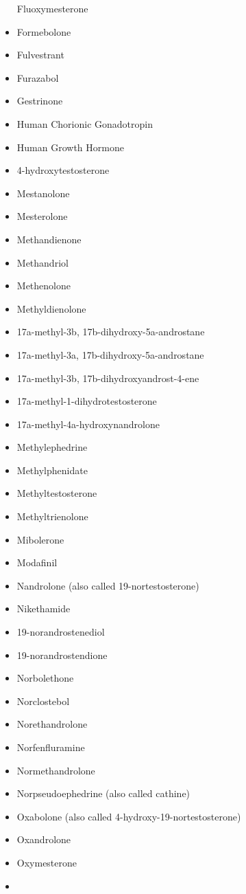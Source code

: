 \documentclass[
]{book}
\begin{document}
\begin{itemize}
  Fluoxymesterone
\item
  Formebolone
\item
  Fulvestrant
\item
  Furazabol
\item
  Gestrinone
\item
  Human Chorionic Gonadotropin
\item
  Human Growth Hormone
\item
  4-hydroxytestosterone
\item
  Mestanolone
\item
  Mesterolone
\item
  Methandienone
\item
  Methandriol
\item
  Methenolone
\item
  Methyldienolone
\item
  17a-methyl-3b, 17b-dihydroxy-5a-androstane
\item
  17a-methyl-3a, 17b-dihydroxy-5a-androstane
\item
  17a-methyl-3b, 17b-dihydroxyandrost-4-ene
\item
  17a-methyl-1-dihydrotestosterone
\item
  17a-methyl-4a-hydroxynandrolone
\item
  Methylephedrine
\item
  Methylphenidate
\item
  Methyltestosterone
\item
  Methyltrienolone
\item
  Mibolerone
\item
  Modafinil
\item
  Nandrolone (also called 19-nortestosterone)
\item
  Nikethamide
\item
  19-norandrostenediol
\item
  19-norandrostendione
\item
  Norbolethone
\item
  Norclostebol
\item
  Norethandrolone
\item
  Norfenfluramine
\item
  Normethandrolone
\item
  Norpseudoephedrine (also called cathine)
\item
  Oxabolone (also called 4-hydroxy-19-nortestosterone)
\item
  Oxandrolone
\item
  Oxymesterone
\item

\end{itemize}
\end{document}
